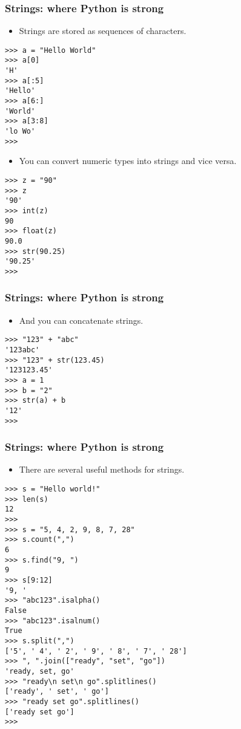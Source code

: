 \documentclass[handout]{beamer}
\numberwithin{equation}{section}
\begin{document}
\begin{frame}[fragile]
\frametitle{Strings: where Python is strong}

\begin{itemize}
\item Strings are stored as sequences of characters.
\end{itemize}

\begin{lstlisting}[name=ex]
>>> a = "Hello World"
>>> a[0]
'H'
>>> a[:5]
'Hello'
>>> a[6:]
'World'
>>> a[3:8]
'lo Wo'
>>> 
\end{lstlisting}

\pause
\begin{itemize}
\item You can convert numeric types into strings and vice versa.
\end{itemize}

\begin{lstlisting}[name=ex]
>>> z = "90"
>>> z
'90'
>>> int(z)
90
>>> float(z)
90.0
>>> str(90.25)
'90.25'
>>> 
\end{lstlisting}
\end{frame}


\begin{frame}[fragile]
\frametitle{Strings: where Python is strong}

\begin{itemize}
\item And you can concatenate strings.
\end{itemize}

\begin{lstlisting}[name=ex]
>>> "123" + "abc"
'123abc'
>>> "123" + str(123.45)
'123123.45'
>>> a = 1
>>> b = "2"
>>> str(a) + b
'12'
>>> 
\end{lstlisting}
\end{frame}


\begin{frame}[fragile]
\frametitle{Strings: where Python is strong}

\begin{itemize}
\item There are several useful methods for strings.
\end{itemize}

\begin{lstlisting}[name=ex]
>>> s = "Hello world!"
>>> len(s)
12
>>>
>>> s = "5, 4, 2, 9, 8, 7, 28"
>>> s.count(",")
6
>>> s.find("9, ")
9
>>> s[9:12]
'9, '
>>> "abc123".isalpha()
False
>>> "abc123".isalnum()
True
>>> s.split(",")
['5', ' 4', ' 2', ' 9', ' 8', ' 7', ' 28']
>>> ", ".join(["ready", "set", "go"])
'ready, set, go'
>>> "ready\n set\n go".splitlines()
['ready', ' set', ' go']
>>> "ready set go".splitlines()
['ready set go']
>>> 
\end{lstlisting}
\end{frame}
\end{document}
